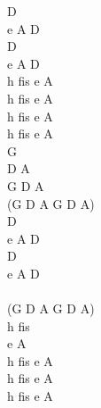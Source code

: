 \documentclass[a5paper, 10pt]{book}
\begin{document}
\begin{minipage}[t]{0.3\textwidth}
D\\
e A D\\
D\\
e A D\\

h fis e A\\
h fis e A\\
h fis e A\\
h fis e A\\

G\\
D A\\
G D A\\
(G D A G D A)\\
D\\
e A D\\
D\\
e A D\\

~\\
(G D A G D A)\\
h fis\\
e A\\
h fis e A\\
h fis e A\\
h fis e A\\
\end{minipage}

\newpage
\end{document}
